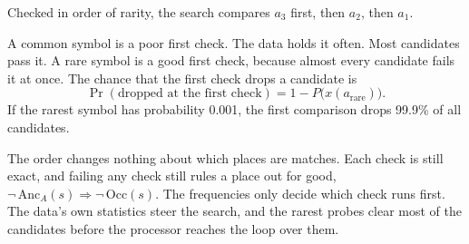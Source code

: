 Checked in order of rarity, the search compares \(a_3\) first, then \(a_2\), then \(a_1\).

A common symbol is a poor first check. The data holds it often. Most candidates pass it. A rare symbol is a good first check, because almost every candidate fails it at once. The chance that the first check drops a candidate is
\[
\Pr(\text{dropped at the first check}) = 1 - P\bigl(x(a_{\text{rare}})\bigr).
\]
If the rarest symbol has probability 0.001, the first comparison drops 99.9\% of all candidates.

The order changes nothing about which places are matches. Each check is still exact, and failing any check still rules a place out for good, \(\neg\,\mathrm{Anc}_A(s) \Rightarrow \neg\,\mathrm{Occ}(s)\). The frequencies only decide which check runs first. The data's own statistics steer the search, and the rarest probes clear most of the candidates before the processor reaches the loop over them.
